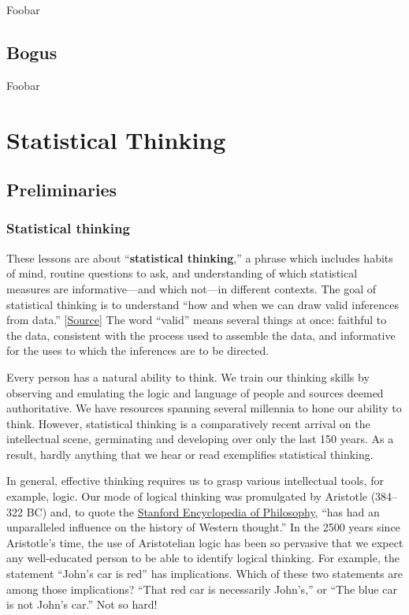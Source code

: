 \documentclass[
  letterpaper,
  DIV=11,
  numbers=noendperiod,
  oneside]{scrreprt}
\begin{document}
Foobar

\hypertarget{bogus-17}{%
\chapter{Bogus}\label{bogus-17}}

Foobar

\part{Statistical Thinking}

\hypertarget{sec-lesson-19}{%
\chapter{Preliminaries}\label{sec-lesson-19}}

\hypertarget{statistical-thinking-2}{%
\section{Statistical thinking}\label{statistical-thinking-2}}

These lessons are about ``\textbf{statistical thinking},'' a phrase
which includes habits of mind, routine questions to ask, and
understanding of which statistical measures are informative---and which
not---in different contexts. The goal of statistical thinking is to
understand ``how and when we can draw valid inferences from data.''
{[}\href{https://nobaproject.com/modules/statistical-thinking}{Source}{]}
The word ``valid'' means several things at once: faithful to the data,
consistent with the process used to assemble the data, and informative
for the uses to which the inferences are to be directed.

Every person has a natural ability to think. We train our thinking
skills by observing and emulating the logic and language of people and
sources deemed authoritative. We have resources spanning several
millennia to hone our ability to think. However, statistical thinking is
a comparatively recent arrival on the intellectual scene, germinating
and developing over only the last 150 years. As a result, hardly
anything that we hear or read exemplifies statistical thinking.

In general, effective thinking requires us to grasp various intellectual
tools, for example, logic. Our mode of logical thinking was promulgated
by Aristotle (384--322 BC) and, to quote the
\href{https://plato.stanford.edu/entries/aristotle-logic/}{Stanford
Encyclopedia of Philosophy}, ``has had an unparalleled influence on the
history of Western thought.'' In the 2500 years since Aristotle's time,
the use of Aristotelian logic has been so pervasive that we expect any
well-educated person to be able to identify logical thinking. For
example, the statement ``John's car is red'' has implications. Which of
these two statements are among those implications? ``That red car is
necessarily John's,'' or ``The blue car is not John's car.'' Not so
hard!
\end{document}
